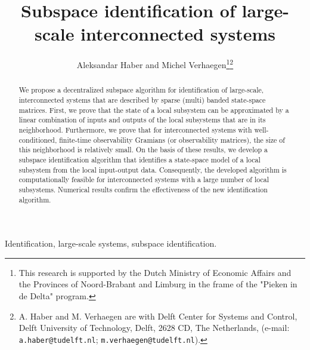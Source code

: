 \documentclass[journal,10pt]{IEEEtran}
\title{\LARGE \bf Subspace identification of large-scale interconnected systems}
\author{Aleksandar Haber and Michel Verhaegen\thanks{This research is supported by the Dutch Ministry of Economic Affairs and the Provinces of Noord-Brabant and Limburg in the frame of the "Pieken in de Delta" program.}\thanks{A. Haber and M. Verhaegen are with Delft Center for Systems and Control, Delft University of Technology, Delft, 2628 CD, The Netherlands, (e-mail: {\tt\small a.haber@tudelft.nl}; {\tt\small m.verhaegen@tudelft.nl}).}
}
\begin{document}
\maketitle
\thispagestyle{empty}
\pagestyle{empty}
\maketitle
\begin{abstract}
We propose a decentralized subspace algorithm for identification of large-scale, interconnected systems that are described by sparse (multi) banded state-space matrices. First, we prove that the state of a local subsystem can be approximated by a linear combination of inputs and outputs of the local subsystems that are in its neighborhood. Furthermore, we prove that for interconnected systems with well-conditioned, finite-time observability Gramians (or observability matrices), the size of this neighborhood is relatively small. On the basis of these results, we develop a subspace identification algorithm that identifies a state-space model of a local subsystem from the local input-output data. Consequently, the developed algorithm is computationally feasible for interconnected systems with a large number of local subsystems. Numerical results confirm the effectiveness of the new identification algorithm. 
\end{abstract}
\begin{IEEEkeywords}
Identification, large-scale systems, subspace identification.
\end{IEEEkeywords}
\end{document}
